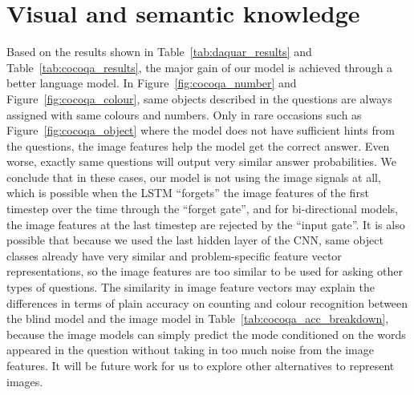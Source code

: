 \section{Visual and semantic knowledge}
Based on the results shown in Table~\ref{tab:daquar_results} and Table~\ref{tab:cocoqa_results}, the major gain of our model is achieved through a better language model. In Figure~\ref{fig:cocoqa_number} and Figure~\ref{fig:cocoqa_colour}, same objects described in the questions are always assigned with same colours and numbers. Only in rare occasions such as Figure~\ref{fig:cocoqa_object} where the model does not have sufficient hints from the questions, the image features help the model get the correct answer. Even worse, exactly same questions will output very similar answer probabilities. We conclude that in these cases, our model is not using the image signals at all, which is possible when the LSTM ``forgets'' the image features of the first timestep over the time through the ``forget gate'', and for bi-directional models, the image features at the last timestep are rejected by the ``input gate''. It is also possible that because we used the last hidden layer of the CNN, same object classes already have very similar and problem-specific feature vector representations, so the image features are too similar to be used for asking other types of questions. The similarity in image feature vectors may explain the differences in terms of plain accuracy on counting and colour recognition between the blind model and the image model in Table~\ref{tab:cocoqa_acc_breakdown}, because the image models can simply predict the mode conditioned on the words appeared in the question without taking in too much noise from the image features. It will be future work for us to explore other alternatives to represent images.